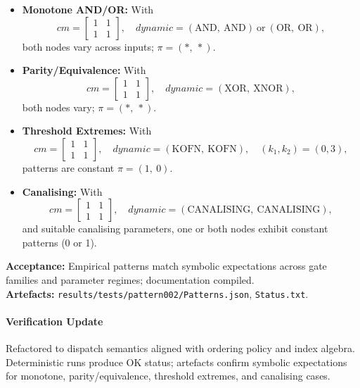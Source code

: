 \documentclass{article}
\begin{document}
\begin{itemize}
\item \textbf{Monotone AND/OR:} With
\[
cm = \begin{bmatrix}1 & 1\\ 1 & 1\end{bmatrix},\quad dynamic=(\text{AND},\ \text{AND})\ \text{or}\ (\text{OR},\ \text{OR}),
\]
both nodes vary across inputs; \(\pi=(*,\ *)\).
\item \textbf{Parity/Equivalence:} With
\[
cm = \begin{bmatrix}1 & 1\\ 1 & 1\end{bmatrix},\quad dynamic=(\text{XOR},\ \text{XNOR}),
\]
both nodes vary; \(\pi=(*,\ *)\).
\item \textbf{Threshold Extremes:} With
\[
cm = \begin{bmatrix}1 & 1\\ 1 & 1\end{bmatrix},\quad dynamic=(\text{KOFN},\ \text{KOFN}),\quad (k_1, k_2)=(0,3),
\]
patterns are constant \(\pi=(1,\ 0)\).
\item \textbf{Canalising:} With
\[
cm = \begin{bmatrix}1 & 1\\ 1 & 1\end{bmatrix},\quad dynamic=(\text{CANALISING},\ \text{CANALISING}),
\]
and suitable canalising parameters, one or both nodes exhibit constant patterns (0 or 1).
\end{itemize}
\textbf{Acceptance:} Empirical patterns match symbolic expectations across gate families and parameter regimes; documentation compiled.\\
\textbf{Artefacts:} \texttt{results/tests/pattern002/Patterns.json}, \texttt{Status.txt}.\
\paragraph{Verification Update} Refactored to dispatch semantics aligned with ordering policy and index algebra. Deterministic runs produce OK status; artefacts confirm symbolic expectations for monotone, parity/equivalence, threshold extremes, and canalising cases.
\end{document}
